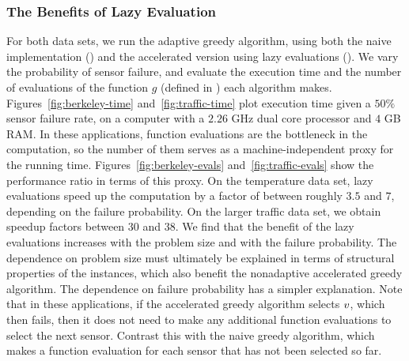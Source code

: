 \subsubsection{The Benefits of Lazy Evaluation}
For both data sets, we run the adaptive greedy algorithm, using both the
naive implementation () and the accelerated version
using lazy evaluations (). We vary the
probability of sensor failure, 
and evaluate the execution time and the number of evaluations of the function $g$ (defined in
) each algorithm makes.  
Figures~\ref{fig:berkeley-time} and~\ref{fig:traffic-time} plot
execution time given a $50\%$ sensor failure rate, on a computer with a
$2.26$ GHz dual core processor and $4$ GB RAM.  
In these applications, function evaluations are the bottleneck in the computation, so the
number of them serves as a machine-independent proxy for the running time. 
Figures~\ref{fig:berkeley-evals} and~\ref{fig:traffic-evals} show the
performance ratio in terms of this proxy. 
%
On the temperature data set, lazy evaluations speed up the computation
by a factor of between roughly $3.5$ and $7$, depending on the failure
probability.  On the larger traffic data set, we obtain speedup factors
between $30$ and $38$.
We find that the benefit of the lazy evaluations
increases with the problem size and with the
failure probability.  
The dependence on problem size must ultimately be explained in terms
of structural properties of the instances,
which also benefit the nonadaptive accelerated greedy algorithm.
The dependence on failure probability has a simpler explanation.
Note that in these applications, if the accelerated greedy algorithm selects $v$, which then 
fails, then it does not need to make any additional function evaluations to select the
next sensor.  Contrast this with the naive greedy algorithm, which 
makes a function evaluation for each sensor that has not been selected
so far.  

